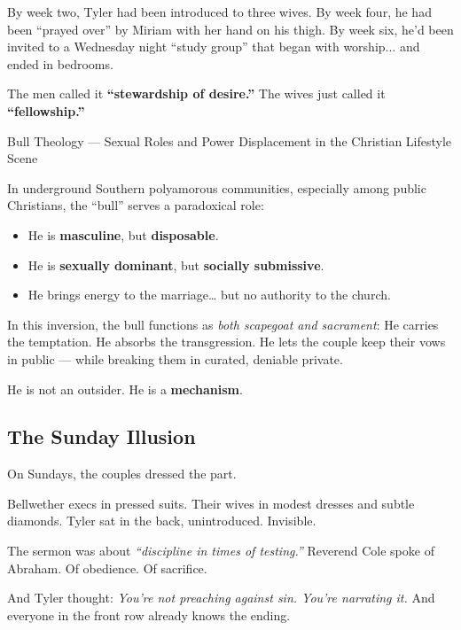 By week two, Tyler had been introduced to three wives.  
By week four, he had been “prayed over” by Miriam with her hand on his thigh.  
By week six, he’d been invited to a Wednesday night “study group” that began with worship... and ended in bedrooms.

The men called it \textbf{``stewardship of desire.''} The wives just called it \textbf{``fellowship.''}

\begin{PsychologicalSidebar}{Bull Theology — Sexual Roles and Power Displacement in the Christian Lifestyle Scene}

In underground Southern polyamorous communities, especially among public Christians, the “bull” serves a paradoxical role:

\medskip

\begin{itemize}
  \item He is \textbf{masculine}, but \textbf{disposable}.  
  \item He is \textbf{sexually dominant}, but \textbf{socially submissive}.  
  \item He brings energy to the marriage… but no authority to the church.
\end{itemize}

\medskip

In this inversion, the bull functions as \textit{both scapegoat and sacrament}:  
He carries the temptation.  
He absorbs the transgression.  
He lets the couple keep their vows in public — while breaking them in curated, deniable private.

\medskip

He is not an outsider.  
He is a \textbf{mechanism}.

\end{PsychologicalSidebar}

\subsection{The Sunday Illusion}

On Sundays, the couples dressed the part.

Bellwether execs in pressed suits. Their wives in modest dresses and subtle diamonds. Tyler sat in the back, unintroduced. Invisible.

The sermon was about \textit{``discipline in times of testing.''}  
Reverend Cole spoke of Abraham. Of obedience. Of sacrifice.

And Tyler thought:  
\textit{You’re not preaching against sin. You’re narrating it.}  
And everyone in the front row already knows the ending.

